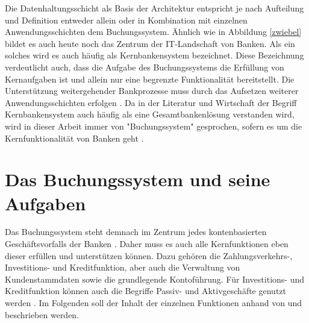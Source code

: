 \documentclass[12pt,oneside,a4paper,parskip]{scrbook}
\begin{document}
Die Datenhaltungsschicht als Basis der Architektur entspricht je nach Aufteilung und Definition entweder allein oder in Kombination mit einzelnen Anwendungsschichten dem Buchungssystem. Ähnlich wie in Abbildung \ref{zwiebel} bildet es auch heute noch das Zentrum der IT-Landschaft von Banken. Als ein solches wird es auch häufig als Kernbankensystem bezeichnet. Diese Bezeichnung verdeutlicht auch, dass die Aufgabe des Buchungssystems die Erfüllung von Kernaufgaben ist und allein nur eine begrenzte Funktionalität bereitstellt. Die Unterstützung weitergehender Bankprozesse muss durch das Aufsetzen weiterer Anwendungsschichten erfolgen \cite[58]{ITidF}. Da in der Literatur und Wirtschaft der Begriff Kernbankensystem auch häufig als eine Gesamtbankenlösung verstanden wird, wird in dieser Arbeit immer von "Buchungssystem" gesprochen, sofern es um die Kernfunktionalität von Banken geht \cite{vergleichCoreBanking}.  


\section{Das Buchungssystem und seine Aufgaben}
Das Buchungssystem steht demnach im Zentrum jedes kontenbasierten Geschäftsvorfalls der Banken \cite{bankEnzy}. Daher muss es auch alle Kernfunktionen eben dieser erfüllen und unterstützen können. Dazu gehören die Zahlungsverkehrs-, Investitions- und Kreditfunktion, aber auch die Verwaltung von Kundenstammdaten sowie die grundlegende Kontoführung. Für Investitions- und Kreditfunktion können auch die Begriffe Passiv- und Aktivgeschäfte genutzt werden \cite[12, 86]{DdF}\cite{einfuehrungKernbanksystem}. Im Folgenden soll der Inhalt der einzelnen Funktionen anhand von \cite[69-88]{DdF} und \cite[91-153]{bankwirtschaft} beschrieben werden.
\end{document}
